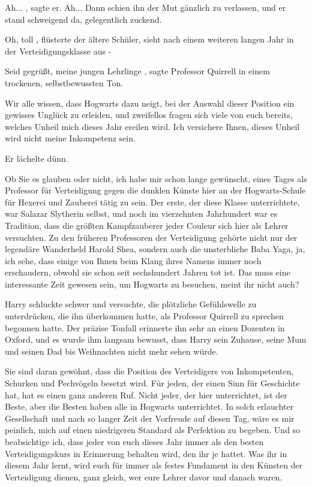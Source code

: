 \glqq Ah...\grqq{} , sagte er. \glqq Ah...\grqq{} Dann schien ihn der Mut
gänzlich zu verlassen, und er stand schweigend da, gelegentlich zuckend.

\glqq Oh, toll\grqq{} , flüsterte der ältere Schüler, \glqq sieht nach einem
weiteren langen Jahr in der Verteidigungsklasse aus -\grqq{}

\glqq Seid gegrüßt, meine jungen Lehrlinge\grqq{} , sagte Professor Quirrell in
einem trockenen, selbstbewussten Ton.

\glqq Wir alle wissen, dass Hogwarts dazu neigt, bei der Auswahl dieser Position
ein gewisses Unglück zu erleiden, und zweifellos fragen sich viele von euch
bereits, welches Unheil mich dieses Jahr ereilen wird. Ich versichere Ihnen,
dieses Unheil wird nicht meine Inkompetenz sein.\grqq{}

Er lächelte dünn.

\glqq Ob Sie es glauben oder nicht, ich habe mir schon lange gewünscht, eines
Tages als Professor für Verteidigung gegen die dunklen Künste hier an der
Hogwarts-Schule für Hexerei und Zauberei tätig zu sein. Der erste, der diese
Klasse unterrichtete, war Salazar Slytherin selbst, und noch im vierzehnten
Jahrhundert war es Tradition, dass die größten Kampfzauberer jeder Couleur sich
hier als Lehrer versuchten. Zu den früheren Professoren der Verteidigung gehörte
nicht nur der legendäre Wanderheld Harold Shea, sondern auch die unsterbliche
Baba Yaga, ja, ich sehe, dass einige von Ihnen beim Klang ihres Namens immer
noch erschaudern, obwohl sie schon seit sechshundert Jahren tot ist. Das muss
eine interessante Zeit gewesen sein, um Hogwarts zu besuchen, meint ihr nicht
auch?\grqq{}

Harry schluckte schwer und versuchte, die plötzliche Gefühlswelle zu
unterdrücken, die ihn überkommen hatte, als Professor Quirrell zu sprechen
begonnen hatte. Der präzise Tonfall erinnerte ihn sehr an einen Dozenten in
Oxford, und es wurde ihm langsam bewusst, dass Harry sein Zuhause, seine Mum und
seinen Dad bis Weihnachten nicht mehr sehen würde.

\glqq Sie sind daran gewöhnt, dass die Position des Verteidigers von
Inkompetenten, Schurken und Pechvögeln besetzt wird. Für jeden, der einen Sinn
für Geschichte hat, hat es einen ganz anderen Ruf. Nicht jeder, der hier
unterrichtet, ist der Beste, aber die Besten haben alle in Hogwarts
unterrichtet. In solch erlauchter Gesellschaft und nach so langer Zeit der
Vorfreude auf diesen Tag, wäre es mir peinlich, mich auf einen niedrigeren
Standard als Perfektion zu begeben. Und so beabsichtige ich, dass jeder von euch
dieses Jahr immer als den besten Verteidigungskurs in Erinnerung behalten wird,
den ihr je hattet. Was ihr in diesem Jahr lernt, wird euch für immer als festes
Fundament in den Künsten der Verteidigung dienen, ganz gleich, wer eure Lehrer
davor und danach waren.\grqq{}

